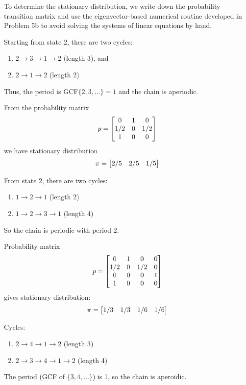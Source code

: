 \documentclass{homework}
\begin{document}
To determine the stationary distribution, we write down the probability transition
matrix and use the eigenvector-based numerical routine developed in Problem 5b
to avoid solving the systems of linear equations by hand.

\begin{letterenum}
\item Starting from state 2, there are two cycles:
\begin{enumerate}
    \item $2 \to 3 \to 1 \to 2$ (length 3), and
    \item $2 \to 1 \to 2$ (length 2)
\end{enumerate}
Thus, the period is GCF$\{2, 3, \dots\} = 1$ and the chain is aperiodic.

From the probability matrix
\begin{equation*}
    p = \begin{bmatrix} 
        0 & 1 & 0 \\
        1/2 & 0 & 1/2 \\
        1 & 0 & 0
     \end{bmatrix}
\end{equation*}
we have stationary distribution
\begin{equation*}
    \pi = \begin{bmatrix} 2/5 & 2/5 & 1/5 \end{bmatrix}
\end{equation*}

\item From state 2, there are two cycles:
\begin{enumerate}
    \item $1 \to 2 \to 1$ (length 2)
    \item $1 \to 2 \to 3 \to 1$ (length 4)
\end{enumerate}
So the chain is periodic with period 2. 

Probability matrix
\begin{equation*}
    p = \begin{bmatrix} 
        0 & 1 & 0 & 0 \\
        1/2 & 0 & 1/2 & 0 \\
        0 & 0 & 0 & 1 \\
        1 & 0 & 0 & 0
     \end{bmatrix}
\end{equation*}
gives stationary distribution:
\begin{equation*}
    \pi = \begin{bmatrix} 1/3 & 1/3 & 1/6 & 1/6 \end{bmatrix}
\end{equation*}

\item Cycles:
\begin{enumerate}
    \item $2 \to 4 \to 1 \to 2$ (length 3)
    \item $2 \to 3\to 4 \to 1 \to 2$ (length 4)
\end{enumerate}
The period (GCF of $\{3, 4, \dots\}$) is 1, so the chain is aperoidic.


\end{letterenum}
\end{document}
